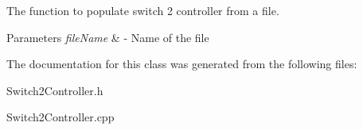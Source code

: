 \-The function to populate switch 2 controller from a file. 


\begin{DoxyParams}{\-Parameters}
{\em file\-Name} & -\/ \-Name of the file \\
\hline
\end{DoxyParams}


\-The documentation for this class was generated from the following files\-:\begin{DoxyCompactItemize}
\item 
\-Switch2\-Controller.\-h\item 
\-Switch2\-Controller.\-cpp\end{DoxyCompactItemize}
